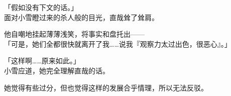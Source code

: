「假如没有下文的话。」\\

面对小雪瞪过来的杀人般的目光，直哉耸了耸肩。

他自嘲地挂起薄薄浅笑，将事实和盘托出——\\

「可是，她们全都很快就离开了我……说我『观察力太过出色，很恶心』。」

「这样啊……原来如此。」\\

小雪应道，她完全理解直哉的话。

她觉得有些过分，但也觉得这样的发展合乎情理，所以无法反驳。
